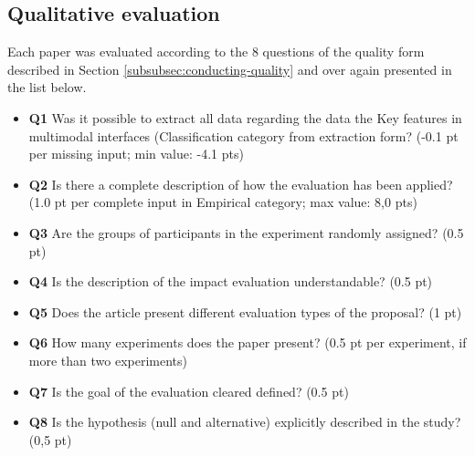  	\begin{figure}[h] 
   	    \captionsetup{width=16cm}%
	\end{figure}
	
\subsection{Qualitative evaluation}
\label{subsec:results-slr-qualitative-evaluation}

Each paper was evaluated according to the 8 questions of the quality form described in Section \ref{subsubsec:conducting-quality} and over again presented in the list below.

\begin{itemize}
    \item \textbf{Q1} Was it possible to extract all data regarding the data the Key features in multimodal interfaces (Classification category from extraction form? (-0.1 pt per missing input; min value: -4.1 pts)
    \item \textbf{Q2} Is there a complete description of how the evaluation has been applied? (1.0 pt per complete input in Empirical category; max value: 8,0 pts)
    \item \textbf{Q3} Are the groups of participants in the experiment randomly assigned? (0.5 pt)
    \item \textbf{Q4} Is the description of the impact evaluation understandable? (0.5 pt)
    \item \textbf{Q5} Does the article present different evaluation types of the proposal? (1 pt)
    \item \textbf{Q6} How many experiments does the paper present? (0.5 pt per experiment, if more than two experiments)
    \item \textbf{Q7} Is the goal of the evaluation cleared defined? (0.5 pt)
    \item \textbf{Q8} Is the hypothesis (null and alternative) explicitly described in the study? (0,5 pt)
\end{itemize}


